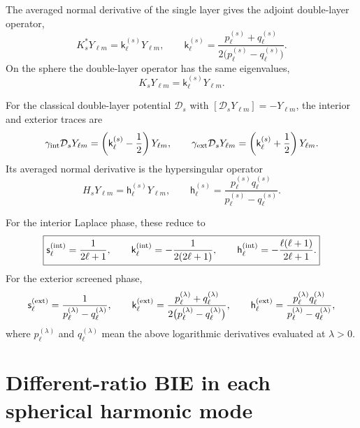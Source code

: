 \documentclass[11pt]{article}
\newcommand{\Ylm}{Y_{\ell m}}
\begin{document}
The averaged normal derivative of the single layer gives the adjoint
double-layer operator,
\[
    K_s^*\Ylm=\mathsf{k}_\ell^{(s)}\Ylm,
    \qquad
    \boxed{
    \mathsf{k}_\ell^{(s)}
    =
    \frac{p_\ell^{(s)}+q_\ell^{(s)}}
         {2\bigl(p_\ell^{(s)}-q_\ell^{(s)}\bigr)} .
    }
\]
On the sphere the double-layer operator has the same eigenvalues,
\[
    K_s\Ylm=\mathsf{k}_\ell^{(s)}\Ylm .
\]

For the classical double-layer potential $\mathcal{D}_s$ with
$[\mathcal{D}_s\Ylm]=-\Ylm$, the interior and exterior traces are
\[
    \gamma_{\rm int}\mathcal{D}_s\Ylm
    =
    \left(\mathsf{k}_\ell^{(s)}-\frac12\right)\Ylm,
    \qquad
    \gamma_{\rm ext}\mathcal{D}_s\Ylm
    =
    \left(\mathsf{k}_\ell^{(s)}+\frac12\right)\Ylm .
\]
Its averaged normal derivative is the hypersingular operator
\[
    H_s\Ylm=\mathsf{h}_\ell^{(s)}\Ylm,
    \qquad
    \boxed{
    \mathsf{h}_\ell^{(s)}
    =
    \frac{p_\ell^{(s)}q_\ell^{(s)}}
         {p_\ell^{(s)}-q_\ell^{(s)}} .
    }
\]

For the interior Laplace phase, these reduce to
\[
    \boxed{
    \mathsf{s}_\ell^{({\rm int})}
    =
    \frac{1}{2\ell+1},
    \qquad
    \mathsf{k}_\ell^{({\rm int})}
    =
    -\frac{1}{2(2\ell+1)},
    \qquad
    \mathsf{h}_\ell^{({\rm int})}
    =
    -\frac{\ell(\ell+1)}{2\ell+1}.
    }
\]
For the exterior screened phase,
\[
    \mathsf{s}_\ell^{({\rm ext})}
    =
    \frac{1}{p_\ell^{(\lambda)}-q_\ell^{(\lambda)}},
    \qquad
    \mathsf{k}_\ell^{({\rm ext})}
    =
    \frac{p_\ell^{(\lambda)}+q_\ell^{(\lambda)}}
         {2\bigl(p_\ell^{(\lambda)}-q_\ell^{(\lambda)}\bigr)},
    \qquad
    \mathsf{h}_\ell^{({\rm ext})}
    =
    \frac{p_\ell^{(\lambda)}q_\ell^{(\lambda)}}
         {p_\ell^{(\lambda)}-q_\ell^{(\lambda)}} ,
\]
where $p_\ell^{(\lambda)}$ and $q_\ell^{(\lambda)}$ mean the above
logarithmic derivatives evaluated at $\lambda>0$.

\section*{Different-ratio BIE in each spherical harmonic mode}
\end{document}
